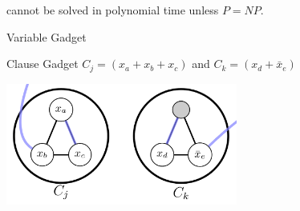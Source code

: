 \begin{frame}{\kXthreeSAT{}}
    \begin{lemma}[3]
        \kXthreeSAT{} cannot be solved in polynomial time unless $P = NP$.
    \end{lemma}
\end{frame}

\begin{frame}{Variable Gadget}
    \begin{minipage}{\linewidth}
        \centering
    \end{minipage}
\end{frame}

\begin{frame}{Clause Gadget}
    \centering
    $C_j = (x_a + x_b + x_c)$ and $C_k = (x_d + \bar x_e)$
    \bigbreak
    \begin{minipage}{\linewidth}
        \centering
        \includegraphics[height=4cm]{images/reduction/clause.png}
    \end{minipage}
\end{frame}

